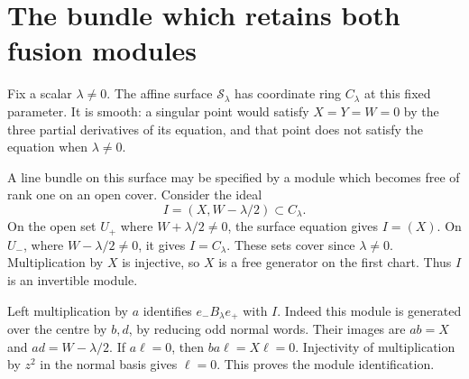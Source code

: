 \section{The bundle which retains both fusion modules}

Fix a scalar \(\lambda\ne0\). The affine surface
\(\mathcal S_\lambda\) has coordinate ring \(C_\lambda\) at this
fixed parameter. It is smooth: a singular point would satisfy
\(X=Y=W=0\) by the three partial derivatives of its equation, and
that point does not satisfy the equation when \(\lambda\ne0\).

A line bundle on this surface may be specified by a module which
becomes free of rank one on an open cover. Consider the ideal
\begin{equation}\label{eq:cs-line}
 I=(X,W-\lambda/2)\subset C_\lambda.
\end{equation}
On the open set \(U_+\) where \(W+\lambda/2\ne0\), the surface
equation gives \(I=(X)\). On \(U_-\), where \(W-\lambda/2\ne0\),
it gives \(I=C_\lambda\). These sets cover since \(\lambda\ne0\).
Multiplication by \(X\) is injective, so \(X\) is a free generator
on the first chart. Thus \(I\) is an invertible module.

Left multiplication by \(a\) identifies \(e_-B_\lambda e_+\)
with \(I\). Indeed this module is generated over the centre by
\(b,d\), by reducing odd normal words. Their images are
\(ab=X\) and \(ad=W-\lambda/2\).
If \(a\ell=0\), then \(ba\ell=X\ell=0\). Injectivity of
multiplication by \(z^2\) in the normal basis gives \(\ell=0\).
This proves the module identification.

